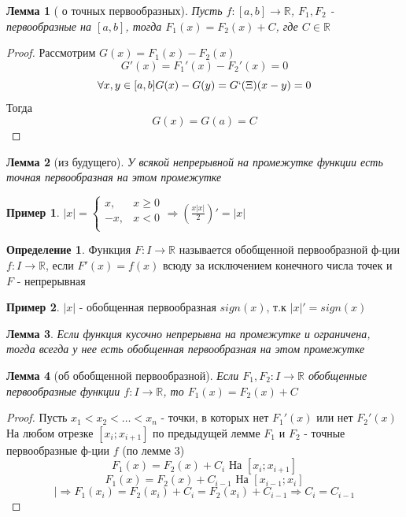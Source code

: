 \documentclass[a4paper]{article}
\newtheorem{lemma}{Лемма}
\theoremstyle{definition}
\newtheorem*{definition*}{Определение}
\newtheorem*{exmp}{Пример}
\numberwithin{theorem}{subsection}
\numberwithin{lemma}{subsection}
\numberwithin{definition}{subsection}
\numberwithin{comment*}{subsection}
\numberwithin{consequence}{subsection}
\numberwithin{property}{subsection}
\begin{document}
\begin{lemma}[ о точных первообразных]
 Пусть $f: [a,b] \rightarrow \mathbb{R}$, $F_1, F_2$ - первообразные на $[a,b]$, тогда $F_1(x)=F_2(x)+C$, где $C \in \mathbb{R}$
\end{lemma}
\begin{proof}
 Рассмотрим $G(x) = F_1(x) - F_2(x)$
 $$ G'(x) = F_1'(x) - F_2'(x) = 0 $$
 $$ \forall{x,y} \in [a,b] G(x) - G(y)=G`(\Xi)(x-y) = 0$$
 Тогда $$G(x)=G(a) = C$$
\end{proof}
\begin{lemma}[из будущего]
 У всякой непрерывной на промежутке функции есть точная первообразная на этом промежутке
\end{lemma}
\begin{exmp}
 $|x| = \begin{cases}
   x,  & x\geq 0 \\
   -x, & x<0     \\
  \end{cases} \Rightarrow
  (\frac{x|x|}{2})'=|x|
 $
\end{exmp}
\begin{definition*}
 Функция $F: I \rightarrow \mathbb{R}$ называется обобщенной первообразной ф-ции $f: I \rightarrow \mathbb{R}$, если $F'(x) = f(x)$ всюду за исключением конечного числа точек и $F$ - непрерывная
\end{definition*}
\begin{exmp}
 $|x|$ - обобщенная первообразная $sign(x)$, т.к $|x|'=sign(x)$
\end{exmp}
\begin{lemma}
 Если функция кусочно непрерывна на промежутке и ограничена, тогда всегда у нее есть обобщенная первообразная на этом промежутке
\end{lemma}
\begin{lemma}[об обобщенной первообразной]
 Если $F_1, F_2: I \rightarrow \mathbb{R}$ обобщенные первообразные функции $f: I \rightarrow \mathbb{R}$, то $F_1(x)= F_2(x)+C$
\end{lemma}
\begin{proof}
 Пусть $x_1<x_2< \dots < x_n$ - точки, в которых нет $F_1'(x)$ или нет $F_2'(x)$\\
 На любом отрезке  $[x_i; x_{i+1}]$ по предыдущей лемме  $F_1$ и $F_2$ - точные первообразные ф-ции $f$ (по лемме 3)\\
 $$ F_1(x)=F_2(x) + C_i  \text{ На }[x_i; x_{i+1}]$$
 $$ F_1(x)=F_2(x) + C_{i-1} \text{ На }[x_{i-1}; x_{i}]$$
 $$|\Rightarrow F_1(x_i)= F_2(x_i) + C_i = F_2(x_i) + C_{i-1} \Rightarrow C_i = C_{i-1}$$
\end{proof}
\end{document}
